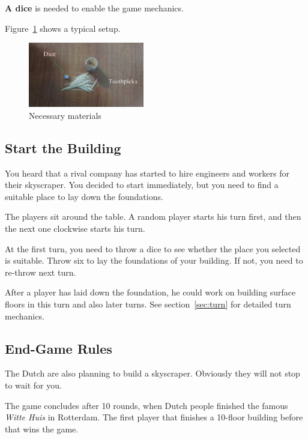 \documentclass[a4paper, twocolumn, 12pt, twoside, english]{article}
\begin{document}
{\bf A dice} is needed to enable the game mechanics.

Figure~\ref{fig:stp} shows a typical setup.
\begin{figure}[!ht]
\centering
\includegraphics[width=0.45\textwidth]{Diagram_game_setup_2.png}
\caption{Necessary materials}
\label{fig:stp}
\end{figure}

\subsection{Start the Building}
\begin{tcolorbox}
You heard that a rival company has started to hire engineers and workers for their skyscraper. You decided to start immediately, but you need to find a suitable place to lay down the foundations.
\end{tcolorbox}
The players sit around the table. A random player starts his turn first, and then the next one clockwise starts his turn.

At the first turn, you need to throw a dice to see whether the place you selected is suitable. Throw six to lay the foundations of your building. If not, you need to re-throw next turn.

After a player has laid down the foundation, he could work on building surface floors in this turn and also later turns. See section~\ref{sec:turn} for detailed turn mechanics.


\subsection{End-Game Rules}
\begin{tcolorbox}
The Dutch are also planning to build a skyscraper. Obviously they will not stop to wait for you.
\end{tcolorbox}
The game concludes after 10 rounds, when Dutch people finished the famous {\it Witte Huis} in Rotterdam. The first player that finishes a 10-floor building before that wins the game.
\end{document}
